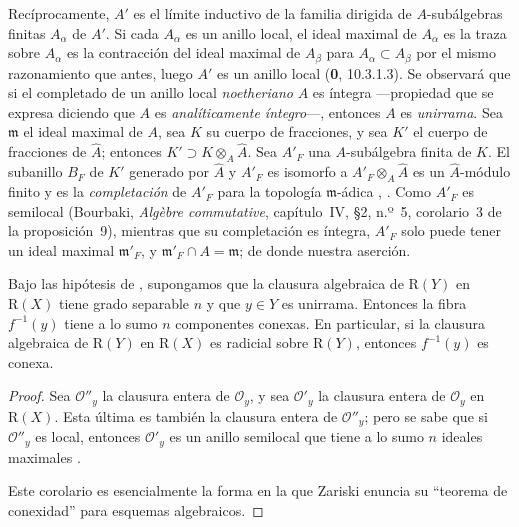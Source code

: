 Recíprocamente, $A'$ es el límite inductivo de la familia dirigida de
$A$-subálgebras finitas $A_\alpha$ de $A'$. Si cada $A_\alpha$ es un anillo local, el ideal maximal
de $A_\alpha$ es la traza sobre $A_\alpha$ es la contracción del ideal maximal de $A_\beta$ para
$A_\alpha\subset A_\beta$ por el mismo razonamiento que antes, luego $A'$ es un anillo local (\textbf{0}, 10.3.1.3). Se observará que si el completado de un anillo local \emph{noetheriano} $A$ es íntegra ---propiedad que se expresa diciendo que
$A$ es \emph{analíticamente íntegro}---, entonces $A$ es \emph{unirrama}.
Sea $\mathfrak m$ el ideal maximal de $A$, sea $K$ su cuerpo de
fracciones, y sea $K'$ el cuerpo de fracciones de $\widehat A$;
entonces
$K'\supset K\otimes_A\widehat A$.
Sea $A'_F$ una $A$-subálgebra finita de $K$. El subanillo $B_F$ de
$K'$ generado por $\widehat A$ y $A'_F$ es isomorfo a
$A'_F\otimes_A\widehat A$
es un $\widehat A$-módulo finito y es la \emph{completación} de $A'_F$
para la topología $\mathfrak m$-ádica
, . Como $A'_F$ es semilocal
(Bourbaki, \emph{Alg\`ebre commutative}, capítulo~IV, \S2, n.º~5,
corolario~3 de la proposición~9), mientras que su completación es
íntegra, $A'_F$ solo puede tener un ideal maximal $\mathfrak m'_F$, y
$\mathfrak m'_F\cap A=\mathfrak m$; de donde nuestra aserción.
\begin{corollary}[4.3.7]
\label{III.4.3.7}
\label{III.4.3.7-fr}
Bajo las hipótesis de \textup{}, supongamos que la clausura
algebraica de $\mathrm R(Y)$ en $\mathrm R(X)$ tiene grado separable
$n$ y que $y\in Y$ es unirrama. Entonces la fibra $f^{-1}(y)$ tiene a
lo sumo $n$ componentes conexas. En particular, si la clausura
algebraica de $\mathrm R(Y)$ en $\mathrm R(X)$ es radicial sobre
$\mathrm R(Y)$, entonces $f^{-1}(y)$ es conexa.
\end{corollary}

\begin{proof}
Sea $\mathcal O''_y$ la clausura entera de $\mathcal O_y$, y sea
$\mathcal O'_y$ la clausura entera de $\mathcal O_y$ en $\mathrm R(X)$.
Esta última es también la clausura entera de $\mathcal O''_y$; pero se sabe que si $\mathcal O''_y$ es local, entonces $\mathcal O'_y$ es
un anillo semilocal que tiene a lo sumo $n$ ideales maximales
\cite[vol.~I, p.~289, Theorem~22]{I-13}.

Este corolario es esencialmente la forma en la que Zariski enuncia su
``teorema de conexidad'' para esquemas algebraicos.
\end{proof}

